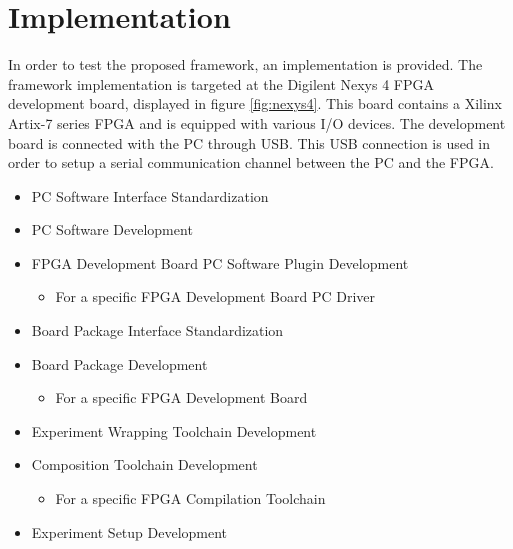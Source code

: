 \documentclass[openright]{template/uva-bachelor-thesis}
\begin{document}



\chapter{Implementation}
In order to test the proposed framework, an implementation is provided. The framework implementation is targeted at the Digilent Nexys 4 FPGA development board, displayed in figure \ref{fig:nexys4}. This board contains a Xilinx Artix-7 series FPGA and is equipped with various I/O devices. The development board is connected with the PC through USB. This USB connection is used in order to setup a serial communication channel between the PC and the FPGA.

\begin{itemize}
\item PC Software Interface Standardization
\item PC Software Development
\item FPGA Development Board PC Software Plugin Development
\begin{itemize}
\item For a specific FPGA Development Board PC Driver
\end{itemize}
\item Board Package Interface Standardization
\item Board Package Development
\begin{itemize}
\item For a specific FPGA Development Board
\end{itemize}
\item Experiment Wrapping Toolchain Development
\item Composition Toolchain Development
\begin{itemize}
\item For a specific FPGA Compilation Toolchain
\end{itemize}
\item Experiment Setup Development
\end{itemize}
\end{document}
